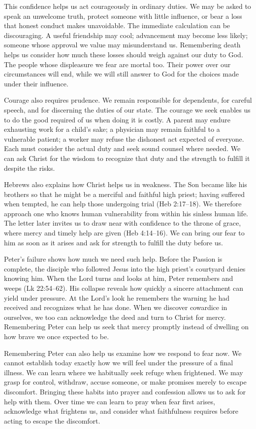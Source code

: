 This confidence helps us act courageously in ordinary duties. We may be asked to speak an unwelcome truth, protect someone with little influence, or bear a loss that honest conduct makes unavoidable. The immediate calculation can be discouraging. A useful friendship may cool; advancement may become less likely; someone whose approval we value may misunderstand us. Remembering death helps us consider how much these losses should weigh against our duty to God. The people whose displeasure we fear are mortal too. Their power over our circumstances will end, while we will still answer to God for the choices made under their influence.

Courage also requires prudence. We remain responsible for dependents, for careful speech, and for discerning the duties of our state. The courage we seek enables us to do the good required of us when doing it is costly. A parent may endure exhausting work for a child's sake; a physician may remain faithful to a vulnerable patient; a worker may refuse the dishonest act expected of everyone. Each must consider the actual duty and seek sound counsel where needed. We can ask Christ for the wisdom to recognize that duty and the strength to fulfill it despite the risks.

Hebrews also explains how Christ helps us in weakness. The Son became like his brothers so that he might be a merciful and faithful high priest; having suffered when tempted, he can help those undergoing trial (Heb 2:17--18). We therefore approach one who knows human vulnerability from within his sinless human life. The letter later invites us to draw near with confidence to the throne of grace, where mercy and timely help are given (Heb 4:14--16). We can bring our fear to him as soon as it arises and ask for strength to fulfill the duty before us.

Peter's failure shows how much we need such help. Before the Passion is complete, the disciple who followed Jesus into the high priest's courtyard denies knowing him. When the Lord turns and looks at him, Peter remembers and weeps (Lk 22:54--62). His collapse reveals how quickly a sincere attachment can yield under pressure. At the Lord's look he remembers the warning he had received and recognizes what he has done. When we discover cowardice in ourselves, we too can acknowledge the deed and turn to Christ for mercy. Remembering Peter can help us seek that mercy promptly instead of dwelling on how brave we once expected to be.

Remembering Peter can also help us examine how we respond to fear now. We cannot establish today exactly how we will feel under the pressure of a final illness. We can learn where we habitually seek refuge when frightened. We may grasp for control, withdraw, accuse someone, or make promises merely to escape discomfort. Bringing these habits into prayer and confession allows us to ask for help with them. Over time we can learn to pray when fear first arises, acknowledge what frightens us, and consider what faithfulness requires before acting to escape the discomfort.

